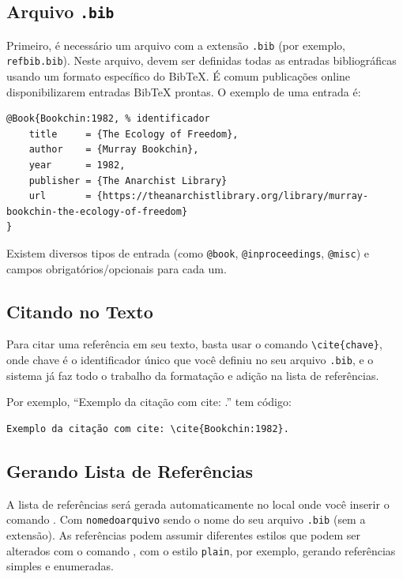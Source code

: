 \subsection{Arquivo \texttt{.bib}}

Primeiro, é necessário um arquivo com a extensão \texttt{.bib} (por exemplo, \texttt{refbib.bib}). Neste arquivo, devem ser definidas todas as entradas bibliográficas usando um formato específico do BibTeX. É comum publicações online disponibilizarem entradas BibTeX prontas. O exemplo de uma entrada é:
\begin{lstlisting}[language={[LaTeX]TeX}]
@Book{Bookchin:1982, % identificador
	title     = {The Ecology of Freedom},
	author    = {Murray Bookchin},
	year      = 1982,
	publisher = {The Anarchist Library}
	url       = {https://theanarchistlibrary.org/library/murray-bookchin-the-ecology-of-freedom}
}
\end{lstlisting}
Existem diversos tipos de entrada (como \texttt{@book}, \texttt{@inproceedings}, \texttt{@misc}) e campos obrigatórios/opcionais para cada um.

\subsection{Citando no Texto}
Para citar uma referência em seu texto, basta usar o comando \verb|\cite{chave}|, onde chave é o identificador único que você definiu no seu arquivo \texttt{.bib}, e o sistema já faz todo o trabalho da formatação e adição na lista de referências.\par
Por exemplo, ``Exemplo da citação com cite: \cite{Bookchin:1982}.'' tem código:
\begin{lstlisting}[language={[LaTeX]TeX}]
Exemplo da citação com cite: \cite{Bookchin:1982}.
\end{lstlisting}

\subsection{Gerando Lista de Referências}
A lista de referências será gerada automaticamente no local onde você inserir o comando \verb||. Com \texttt{nomedoarquivo} sendo o nome do seu arquivo \texttt{.bib} (sem a extensão). As referências podem assumir diferentes estilos que podem ser alterados com o comando \verb||, com o estilo \texttt{plain}, por exemplo, gerando referências simples e enumeradas.
